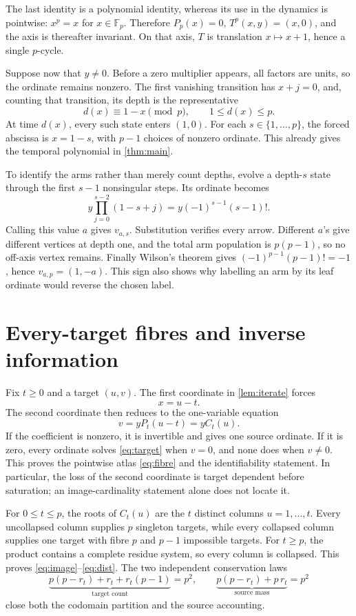 \documentclass[10pt,a4paper]{amsart}
\theoremstyle{remark}
\newcommand{\F}{\mathbb F}
\begin{document}
The last identity is a polynomial identity, whereas its use in the dynamics
is pointwise: \(x^p=x\) for \(x\in\F_p\).  Therefore
\(P_p(x)=0\), \(T^p(x,y)=(x,0)\), and the axis is thereafter invariant.
On that axis, \(T\) is translation \(x\mapsto x+1\), hence a single
\(p\)-cycle.

Suppose now that \(y\neq0\).  Before a zero multiplier appears, all factors
are units, so the ordinate remains nonzero.  The first vanishing transition
has \(x+j=0\), and, counting that transition, its depth is the representative
\[
 d(x)\equiv1-x\pmod p,\qquad 1\leq d(x)\leq p.       \tag{5}
\]
At time \(d(x)\), every such state enters \((1,0)\).  For each
\(s\in\{1,\dots,p\}\), the forced abscissa is \(x=1-s\), with \(p-1\)
choices of nonzero ordinate.  This already gives the temporal polynomial in
\cref{thm:main}.

To identify the arms rather than merely count depths, evolve a depth-\(s\)
state through the first \(s-1\) nonsingular steps.  Its ordinate becomes
\[
y\prod_{j=0}^{s-2}(1-s+j)
=y(-1)^{s-1}(s-1)!.
\]
Calling this value \(a\) gives \(v_{a,s}\).  Substitution verifies every
arrow.  Different \(a\)'s give different vertices at depth one, and the
total arm population is \(p(p-1)\), so no off-axis vertex remains.
Finally Wilson's theorem gives
\((-1)^{p-1}(p-1)!=-1\), hence \(v_{a,p}=(1,-a)\).
This sign also shows why labelling an arm by its leaf ordinate would reverse
the chosen label.

\section{Every-target fibres and inverse information}

Fix \(t\geq0\) and a target \((u,v)\).  The first coordinate in
\cref{lem:iterate} forces
\[
x=u-t.
\]
The second coordinate then reduces to the one-variable equation
\[
v=yP_t(u-t)=yC_t(u).                                 \tag{6}\label{eq:target}
\]
If the coefficient is nonzero, it is invertible and gives one source
ordinate.  If it is zero, every ordinate solves \eqref{eq:target} when \(v=0\),
and none does when \(v\neq0\).  This proves the pointwise atlas
\eqref{eq:fibre} and the identifiability statement.  In particular, the
loss of the second coordinate is target dependent before saturation; an
image-cardinality statement alone does not locate it.

For \(0\leq t\leq p\), the roots of \(C_t(u)\) are the \(t\) distinct
columns \(u=1,\ldots,t\).  Every uncollapsed column supplies \(p\) singleton
targets, while every collapsed column supplies one target with fibre \(p\)
and \(p-1\) impossible targets.  For \(t\geq p\), the product contains a
complete residue system, so every column is collapsed.  This proves
\eqref{eq:image}--\eqref{eq:dist}.  The two independent conservation laws
\[
\underbrace{p(p-r_t)+r_t+r_t(p-1)}_{\text{target count}}=p^2,
\qquad
\underbrace{p(p-r_t)+p\,r_t}_{\text{source mass}}=p^2                 \tag{7}
\]
close both the codomain partition and the source accounting.
\end{document}
